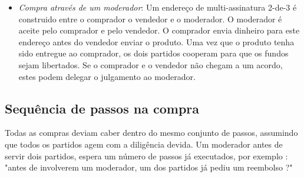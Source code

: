 \begin{itemize}
\begin{itemize}
    \end{itemize}{}
    \item {\em Compra através de um moderador}: Um endereço de multi-assinatura 2-de-3 é construido entre o comprador o vendedor e o moderador. O moderador é aceite pelo comprador e pelo vendedor. O comprador envia dinheiro para este endereço antes do vendedor enviar o produto. Uma vez que o produto tenha sido entregue ao comprador, os dois partidos cooperam para que os fundos sejam libertados. Se o comprador e o vendedor não chegam a um acordo, estes podem delegar o julgamento ao moderador.  
\end{itemize}




\subsection{Sequência de passos na compra}
\label{subsec:escrowed-marketplace-purchasing-workflow}

Todas as compras deviam caber dentro do mesmo conjunto de passos, assumindo que todos os partidos agem com a diligência devida. Um moderador antes de servir dois partidos, espera um número de passos já executados, por exemplo : "antes de involverem um moderador, um dos partidos já pediu um reembolso ?" 

